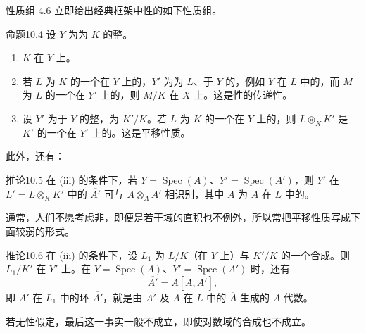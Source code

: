 性质组 4.6 立即给出经典框架中性的如下性质组。
\begin{SGAresult}{命题}{10.4}
设 $Y$ 为为 $K$ 的整。
\begin{enumerate}
\item[(i)] $K$ 在 $Y$ 上。
\item[(ii)] 若 $L$ 为 $K$ 的一个在 $Y$ 上的，$Y'$ 为为 $L$、于 $Y$ 的，例如 $Y$ 在 $L$ 中的，而 $M$ 为 $L$ 的一个在 $Y'$ 上的，则 $M/K$ 在 $X$ 上。这是性的传递性。
\item[(iii)] 设 $Y'$ 为于 $Y$ 的整，为 $K'/K$。若 $L$ 为 $K$ 的一个在 $Y$ 上的，则 $L\otimes_K K'$ 是 $K'$ 的一个在 $Y'$ 上的。这是平移性质。
\end{enumerate}
\end{SGAresult}
此外，还有：
\begin{SGAresult}{推论}{10.5}
在 (iii) 的条件下，若 $Y=\operatorname{Spec}(A)$、$Y'=\operatorname{Spec}(A')$，则 $Y'$ 在 $L'=L\otimes_K K'$ 中的 $\overline{A'}$ 可与 $\overline A\otimes_A A'$ 相识别，其中 $\overline A$ 为 $A$ 在 $L$ 中的。
\end{SGAresult}
通常，人们不愿考虑非，即便是若干域的直积也不例外，所以常把平移性质写成下面较弱的形式。
\begin{SGAresult}{推论}{10.6}
在 (iii) 的条件下，设 $L_1$ 为 $L/K$（在 $Y$ 上）与 $K'/K$ 的一个合成。则 $L_1/K'$ 在 $Y'$ 上。在 $Y=\operatorname{Spec}(A)$、$Y'=\operatorname{Spec}(A')$ 时，还有
\[
 \overline{A'}=A[\overline A,A'],
\]
即 $A'$ 在 $L_1$ 中的环 $\overline{A'}$，就是由 $A'$ 及 $A$ 在 $L$ 中的 $\overline A$ 生成的 $A$-代数。
\end{SGAresult}
若无性假定，最后这一事实一般不成立，即使对数域的合成也不成立。

